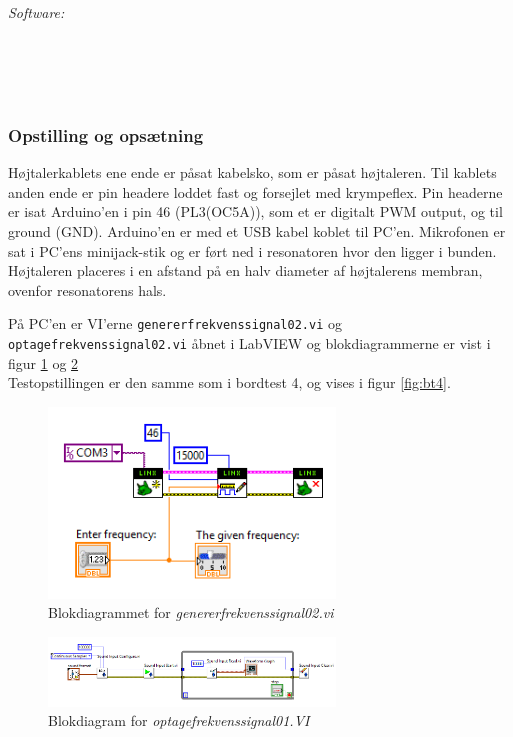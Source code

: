 		\textit{Software:}\\
		\labview\\
		\visa\\
		\vi\\
		\ardsw\\
		
		
		\subsubsection{Opstilling og opsætning}
		
		Højtalerkablets ene ende er påsat kabelsko, som er påsat højtaleren. Til kablets anden ende er pin headere loddet fast og forsejlet med krympeflex. Pin headerne er isat Arduino'en i pin 46 (PL3(OC5A)), som et er digitalt PWM output, og til ground (GND). 
		Arduino'en er med et USB kabel koblet til PC'en.	
		Mikrofonen er sat i PC'ens minijack-stik og er ført ned i resonatoren hvor den ligger i bunden. Højtaleren placeres i en afstand på en halv diameter af højtalerens membran, ovenfor resonatorens hals. 
		
		På PC'en er VI'erne \texttt{genererfrekvenssignal02.vi} og \texttt{optagefrekvenssignal02.vi} åbnet i LabVIEW og blokdiagrammerne er vist i figur \ref{fig:5gf02} og \ref{fig:5of01} \\ Testopstillingen er den samme som i bordtest 4, og vises i figur \ref{fig:bt4}.  
		

\begin{figure}[htb]
			\centering
				\includegraphics[width=3in]{gf02}
				\caption{Blokdiagrammet for \textit{genererfrekvenssignal02.vi}}	
				\label{fig:5gf02}
			\end{figure} 
\vspace{5mm}
			\begin{figure}[htb]
			\centering
				\includegraphics[width=3in]{of01}
				\caption{Blokdiagram for \textit{optagefrekvenssignal01.VI}}	
				\label{fig:5of01}
			\end{figure}
\vspace{5mm}
		

